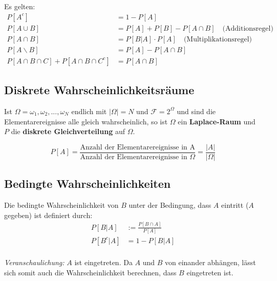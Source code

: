 \documentclass[11pt]{article}
\begin{document}
Es gelten:
\begin{equation*}
\begin{split}
	P[A^c] & = 1 - P[A] \\
	P[A \cup B] & = P[A] + P[B] - P[A \cap B] \quad\text{(Additionsregel)} \\
	P[A \cap B] & = P[B|A] \cdot P[A] \quad\text{(Multiplikationsregel)} \\
	P[A \backslash B] & = P[A] - P[A \cap B] \\
	P[A \cap B \cap C] + P[A \cap B \cap C^c] & = P[A \cap B]
\end{split}
\end{equation*}

\subsection{Diskrete Wahrscheinlichkeitsr{\"a}ume}

Ist $\Omega = {\omega_1, \omega_2,...,\omega_N}$ endlich mit $|\Omega| = N$ und $\mathcal{F} = 2^\Omega$ und sind die Elementarereignisse alle gleich wahrscheinlich, so ist $\Omega$ ein \textbf{Laplace-Raum} und $P$ die \textbf{diskrete Gleichverteilung} auf $\Omega$.

\begin{equation*}
	P[A] = \frac{\text{Anzahl der Elementarereignisse in A}}{\text{Anzahl der Elementarereignisse in $\Omega$}} = \frac{|A|}{|\Omega|}
\end{equation*}

\subsection{Bedingte Wahrscheinlichkeiten}

Die bedingte Wahrscheinlichkeit von $B$ unter der Bedingung, dass $A$ eintritt ($A$ gegeben) ist definiert durch:
\begin{equation*}
\begin{split}
	P[B|A] & := \frac{P[B \cap A]}{P[A]} \\
	P[B^c|A] & = 1-P[B|A] \\
\end{split}
\end{equation*}

\emph{Veranschaulichung:} $A$ ist eingetreten. Da $A$ und $B$ von einander abh{\"a}ngen, l{\"a}sst sich somit auch die Wahrscheinlichkeit berechnen, dass $B$ eingetreten ist.
\end{document}
